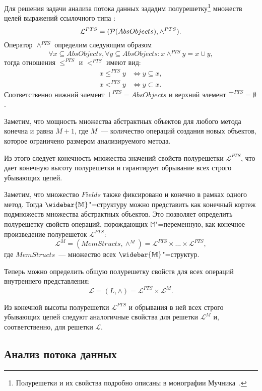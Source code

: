 \documentclass[14pt,titlepage,draft]{extarticle}
\newcommand{\M}{\ensuremath{\mathbb{M}}}
\newcommand{\Ms}{\ensuremath{\mathbb{\widebar{M}}}}
\newcommand{\Lattice}{\mathcal{L}}
\newcommand{\meet}{\wedge}
\begin{document}
    Для решения задачи анализа потока данных зададим полурешетку\footnote{
      Полурешетки и их свойства подробно описаны в монографии
      Мучника~\cite{muchnick}.
    }
    множеств целей выражений ссылочного типа :
    \[ \Lattice^{PTS} = (\powerset{AbsObjects}, \meet^{PTS}).\]
    Оператор $\meet^{PTS}$ определим следующим образом
    \[
      \forall x \subseteq AbsObjects, \forall y \subseteq AbsObjects
      \colon
      x \meet^{PTS} y = x \cup y,
    \]
    тогда отношения $\leq^{PTS}$ и $<^{PTS}$ имеют вид:
    \begin{align*}
      x \leq^{PTS} y &\Leftrightarrow y \subseteq x, \\
      x <^{PTS} y &\Leftrightarrow y \subset x.
    \end{align*}
    Соответственно нижний элемент $\bot^{PTS} = AbsObjects$
    и верхний элемент $\top^{PTS} = \emptyset$.

    Заметим, что мощность множества абстрактных объектов для любого
    метода конечна и равна $M + 1$,
    где $M$~--- количество операций создания новых объектов, которое ограничено
    размером анализируемого метода.

    Из этого следует конечность множества значений свойств полурешетки
    $\Lattice^{PTS}$, что дает конечную высоту полурешетки и гарантирует
    обрывание всех строго убывающих цепей.

    Заметим, что множество $Fields$ также фиксировано и конечно в
    рамках одного метод.
    Тогда \Ms"=структуру можно представить как конечный кортеж подмножеств
    множества абстрактных объектов.
    Это позволяет определить полурешетку свойств операций, порождающих
    \M"=переменную, как конечное произведение полурешеток $\Lattice^{PTS}$:
    \[\Lattice^M = (MemStructs, \meet^M) =
      \Lattice^{PTS} \times \ldots \times \Lattice^{PTS},\]
    где $MemStructs$~--- множество всех \Ms"=структур.

    Теперь можно определить общую полурешетку свойств для всех операций
    внутреннего представления:
    \[ \Lattice = (L, \meet) = \Lattice^{PTS} \times \Lattice^M. \]

    Из конечной высоты полурешетки $\Lattice^{PTS}$
    и обрывания в ней всех строго убывающих цепей следуют аналогичные свойства
    для решетки $\Lattice^M$ и, соответственно, для решетки $\Lattice$.

  \subsection{Анализ потока данных}
\end{document}
